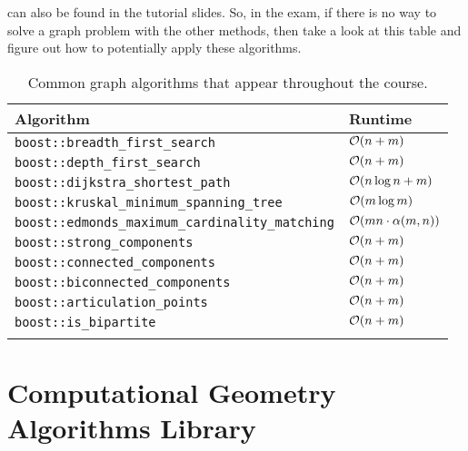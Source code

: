 \documentclass[justified,nobib]{tufte-handout}
\begin{document}
 can also be found in the tutorial slides. So, in the exam, if there is no way to
solve a graph problem with the other methods, then take a look at this table and
figure out how to potentially apply these algorithms.

\begin{table}[h]
    \centering
    \caption{Common graph algorithms that appear throughout the course.}
    \label{tab:graph-algos}
    \begin{tabular}{ll} \toprule
        Algorithm                                               & Runtime                     \\
        \midrule
        \texttt{boost::breadth\_first\_search}                  & $\bigo{n+m}$                \\
        \texttt{boost::depth\_first\_search}                    & $\bigo{n+m}$                \\
        \texttt{boost::dijkstra\_shortest\_path}                & $\bigo{n\log n + m}$        \\
        \texttt{boost::kruskal\_minimum\_spanning\_tree}        & $\bigo{m\log m}$            \\
        \texttt{boost::edmonds\_maximum\_cardinality\_matching} & $\bigo{mn\cdot\alpha(m,n)}$ \\
        \texttt{boost::strong\_components}                      & $\bigo{n+m}$                \\
        \texttt{boost::connected\_components}                   & $\bigo{n+m}$                \\
        \texttt{boost::biconnected\_components}                 & $\bigo{n+m}$                \\
        \texttt{boost::articulation\_points}                    & $\bigo{n+m}$                \\
        \texttt{boost::is\_bipartite}                           & $\bigo{n+m}$                \\
        \bottomrule                                                                           \\
    \end{tabular}
\end{table}

\section{Computational Geometry Algorithms Library}
\end{document}
